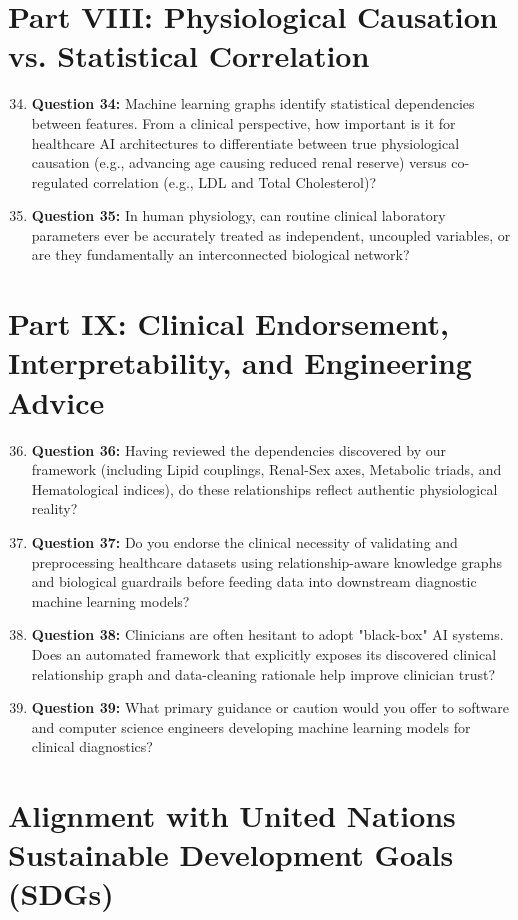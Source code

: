 \documentclass[MTech]{ugthesis}
\begin{document}
\begin{appendices}
\section*{Part VIII: Physiological Causation vs. Statistical Correlation}
\begin{enumerate}\setcounter{enumi}{33}
    \item \textbf{Question 34:} Machine learning graphs identify statistical dependencies between features. From a clinical perspective, how important is it for healthcare AI architectures to differentiate between true physiological causation (e.g., advancing age causing reduced renal reserve) versus co-regulated correlation (e.g., LDL and Total Cholesterol)?
    \item \textbf{Question 35:} In human physiology, can routine clinical laboratory parameters ever be accurately treated as independent, uncoupled variables, or are they fundamentally an interconnected biological network?
\end{enumerate}

\section*{Part IX: Clinical Endorsement, Interpretability, and Engineering Advice}
\begin{enumerate}\setcounter{enumi}{35}
    \item \textbf{Question 36:} Having reviewed the dependencies discovered by our framework (including Lipid couplings, Renal-Sex axes, Metabolic triads, and Hematological indices), do these relationships reflect authentic physiological reality?
    \item \textbf{Question 37:} Do you endorse the clinical necessity of validating and preprocessing healthcare datasets using relationship-aware knowledge graphs and biological guardrails before feeding data into downstream diagnostic machine learning models?
    \item \textbf{Question 38:} Clinicians are often hesitant to adopt "black-box" AI systems. Does an automated framework that explicitly exposes its discovered clinical relationship graph and data-cleaning rationale help improve clinician trust?
    \item \textbf{Question 39:} What primary guidance or caution would you offer to software and computer science engineers developing machine learning models for clinical diagnostics?
\end{enumerate}

\section{Alignment with United Nations Sustainable Development Goals (SDGs)}


\end{appendices}
\end{document}
